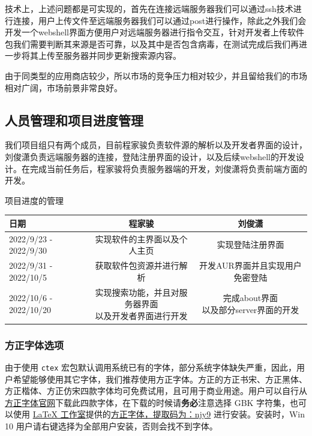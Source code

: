 \documentclass[lang=cn,a4paper]{elegantpaper}
\begin{document}
技术上，上述问题都是可实现的，首先在连接远端服务器我们可以通过ssh技术进行连接，用户上传文件至远端服务器我们可以通过post进行操作，除此之外我们会开发一个webshell界面方便用户对远端服务器进行指令交互，针对开发者上传软件包我们需要判断其来源是否可靠，以及其中是否包含病毒，在测试完成后我们再进一步将其上传至服务器并同步更新搜索源内容。

由于同类型的应用商店较少，所以市场的竞争压力相对较少，并且留给我们的市场相对广阔，市场前景非常良好。


\subsection{人员管理和项目进度管理}

我们项目组只有两个成员，目前程家骏负责软件源的解析以及开发者界面的设计，刘俊潇负责远端服务器的连接，登陆注册界面的设计，以及后续webshell的开发设计。在完成当前任务后，程家骏将负责服务器端的开发，刘俊潇将负责前端方面的开发。

项目进度的管理

\begin{tabular}{|l|c|c|}%
\hline
日期&程家骏&刘俊潇\\
\hline
2022/9/23 - 2022/9/30&实现软件的主界面以及个人主页&实现登陆注册界面\\%
\hline
2022/9/31 - 2022/10/5&获取软件包资源并进行解析&开发AUR界面并且实现用户免密登陆 \\
\hline
2022/10/6 - 2022/10/20&\makecell[c]{实现搜索功能，并且对服务器界面\\以及开发者界面进行开发}&\makecell[c]{完成about界面\\以及部分server界面的开发}\\
\hline
\end{tabular}

\subsubsection{方正字体选项}
由于使用 \lstinline{ctex} 宏包默认调用系统已有的字体，部分系统字体缺失严重，因此，用户希望能够使用其它字体，我们推荐使用方正字体。方正的{\songti 方正书宋}、{\heiti 方正黑体}、{\kaishu 方正楷体}、{\fangsong 方正仿宋}四款字体均可免费试用，且可用于商业用途。用户可以自行从\href{http://www.foundertype.com/}{方正字体官网}下载此四款字体，在下载的时候请\textbf{务必}注意选择 GBK 字符集，也可以使用 \href{https://www.latexstudio.net/}{\LaTeX{} 工作室}提供的\href{https://pan.baidu.com/s/1BgbQM7LoinY7m8yeP25Y7Q}{方正字体，提取码为：njy9} 进行安装。安装时，{\kaishu Win 10 用户请右键选择为全部用户安装，否则会找不到字体。}
\end{document}
